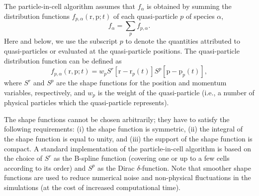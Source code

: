 \documentclass[10pt, a4paper, twoside, openright]{report}
\renewcommand{\vec}[1]{\boldsymbol{\mathrm{#1}}}
\begin{document}
The particle-in-cell algorithm assumes that $ f_{\alpha} $ is obtained by summing the distribution functions $ f_{p, \alpha} \left( \vec{r}, \vec{p}; t \right) $ of each quasi-particle $ p $ of species $ \alpha $,
\begin{equation}\label{eq:dist_function}
	f_{\alpha} =  \sum_{p} f_{p, \alpha}.
\end{equation}
Here and below, we use the subscript $ p $ to denote the quantities attributed to quasi-particles or evaluated at the quasi-particle positions. The quasi-particle distribution function can be defined as 
\begin{equation}\label{eq:quasi_particle_dist_function}
	f_{p, \alpha} \left( \vec{r}, \vec{p}; t \right) = w_{p} S^r \left[ \vec{r} - \vec{r}_{p} \left( t \right) \right] S^p \left[ \vec{p} - \vec{p}_{p} \left( t \right) \right],
\end{equation}
where $ S^r $ and $ S^p $ are the shape functions for the position and momentum variables, respectively, and $ w_{p} $ is the weight of the quasi-particle (i.e., a number of physical particles which the quasi-particle represents).

The shape functions cannot be chosen arbitrarily; they have to satisfy the following requirements: (i) the shape function is symmetric, (ii) the integral of the shape function is equal to unity, and (iii) the support of the shape function is compact. A standard implementation of the particle-in-cell algorithm is based on the choice of $ S^r $ as the B-spline function (covering one or up to a few cells according to its order) and $ S^p $ as the Dirac $ \delta $-function. Note that smoother shape functions are used to reduce numerical noise and non-physical fluctuations in the simulations (at the cost of increased computational time).
\end{document}
